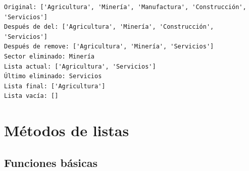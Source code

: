 \documentclass[
  doc,
  floatsintext,
  longtable,
  a4paper,
  nolmodern,
  notxfonts,
  notimes,
  12pt,
  colorlinks=true,linkcolor=blue,citecolor=blue,urlcolor=blue]{apa7}
\begin{document}
\begin{verbatim}
Original: ['Agricultura', 'Minería', 'Manufactura', 'Construcción', 'Servicios']
Después de del: ['Agricultura', 'Minería', 'Construcción', 'Servicios']
Después de remove: ['Agricultura', 'Minería', 'Servicios']
Sector eliminado: Minería
Lista actual: ['Agricultura', 'Servicios']
Último eliminado: Servicios
Lista final: ['Agricultura']
Lista vacía: []
\end{verbatim}

\section{Métodos de listas}\label{muxe9todos-de-listas}

\subsection{Funciones básicas}\label{funciones-buxe1sicas}
\end{document}
